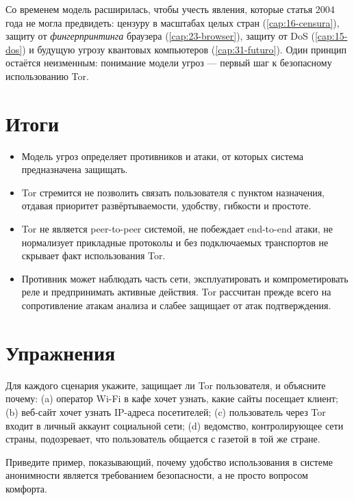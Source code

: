 Со временем модель расширилась, чтобы учесть явления, которые статья 2004 года не могла предвидеть: цензуру в масштабах целых стран (\cref{cap:16-censura}), защиту от \emph{фингерпринтинга} браузера (\cref{cap:23-browser}), защиту от DoS (\cref{cap:15-dos}) и будущую угрозу квантовых компьютеров (\cref{cap:31-futuro}). Один принцип остаётся неизменным: понимание модели угроз --- первый шаг к безопасному использованию Tor.

\section*{Итоги}
\begin{itemize}
  \item Модель угроз определяет противников и атаки, от которых система предназначена защищать.
  \item Tor стремится не позволить связать пользователя с пунктом назначения, отдавая приоритет развёртываемости, удобству, гибкости и простоте.
  \item Tor не является peer-to-peer системой, не побеждает end-to-end атаки, не нормализует прикладные протоколы и без подключаемых транспортов не скрывает факт использования Tor.
  \item Противник может наблюдать часть сети, эксплуатировать и компрометировать реле и предпринимать активные действия. Tor рассчитан прежде всего на сопротивление атакам анализа и слабее защищает от атак подтверждения.
\end{itemize}

\section*{Упражнения}

\begin{esercizio}[1]\label{es:04-casi}
Для каждого сценария укажите, защищает ли Tor пользователя, и объясните почему: (a) оператор Wi-Fi в кафе хочет узнать, какие сайты посещает клиент; (b) веб-сайт хочет узнать IP-адреса посетителей; (c) пользователь через Tor входит в личный аккаунт социальной сети; (d) ведомство, контролирующее сети страны, подозревает, что пользователь общается с газетой в той же стране.
\end{esercizio}

\begin{esercizio}[2]\label{es:04-usabilita}
Приведите пример, показывающий, почему удобство использования в системе анонимности является требованием безопасности, а не просто вопросом комфорта.
\end{esercizio}

